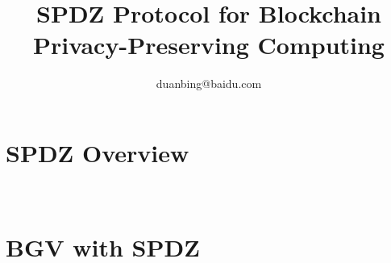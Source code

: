 \documentclass[a4paper,11pt]{article}
\author{duanbing@baidu.com}
\title{SPDZ Protocol for Blockchain Privacy-Preserving Computing}
\begin{document}
\maketitle  
\tableofcontents


\section{SPDZ Overview}
  


\section{BGV with SPDZ}





\end{document}
